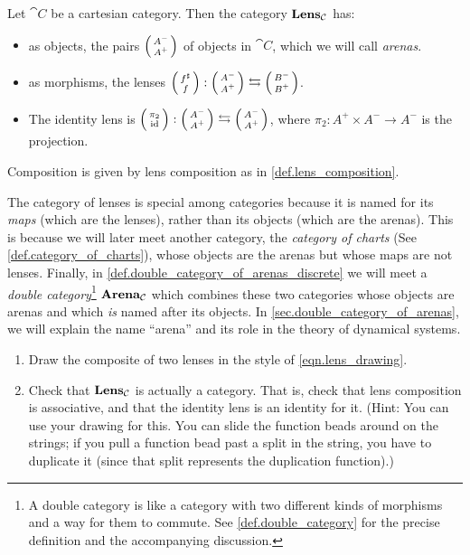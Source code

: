 \documentclass[DynamicalBook]{subfiles}
\begin{document}
\begin{definition}\label{def.lens_category}
Let $\cat{C}$ be a cartesian category. Then the category $\textbf{Lens}_{\mathcal{C}}$
has:
\begin{itemize}
\item as objects, the pairs $\lens{A^-}{A^+}$ of objects in $\cat{C}$, which we will
  call \emph{arenas}.
\item as morphisms, the lenses $\lens{f^{\sharp}}{f} : \lens{A^-}{A^+} \leftrightarrows \lens{B^-}{B^+}$.
\item The identity lens is $\lens{\pi_2}{\id} : \lens{A^-}{A^+} \leftrightarrows
  \lens{A^-}{A^+}$, where $\pi_2 : A^+ \times A^- \to A^-$ is the projection.
\end{itemize}
\item Composition is given by lens composition as in \cref{def.lens_composition}.
\end{definition}

\begin{remark}
  The category of lenses is special among categories because it is named for its
  \emph{maps} (which are the lenses), rather than its objects (which are the
  arenas). This is because we will later meet another category, the
  \emph{category of charts} (See \cref{def.category_of_charts}), whose objects are
  the arenas but whose maps are not lenses. Finally, in
  \cref{def.double_category_of_arenas_discrete} we will meet a \emph{double
    category}\footnote{A double category is like a category with two different
    kinds of morphisms and a way for them to commute. See
    \cref{def.double_category} for the precise definition and the accompanying
    discussion.} $\textbf{Arena}_{\mathcal{C}}$ which combines these two categories whose objects
  are arenas and which \emph{is} named after its objects. In
  \cref{sec.double_category_of_arenas}, we will explain the name ``arena'' and
  its role in the theory of dynamical systems.
\end{remark}

\begin{exercise}
  \begin{enumerate}
  	\item Draw the composite of two lenses in the style of \eqref{eqn.lens_drawing}.
   	\item Check that $\textbf{Lens}_{\mathcal{C}}$ is actually a category. That is, check that
    lens composition is associative, and that the identity lens is an identity
    for it. (Hint: You can use your drawing for this. You can slide the function
    beads around on the strings; if you pull a function bead past a split in the
    string, you have to duplicate it (since that split represents the
    duplication function).)
  \qedhere
  \end{enumerate}
\end{exercise}
\end{document}
